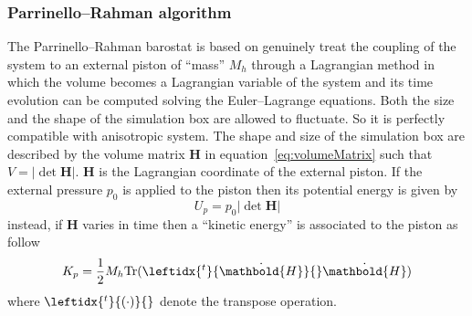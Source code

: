 \subsubsection{Parrinello--Rahman algorithm}
The Parrinello--Rahman barostat \cite{ParrinelloBarostat1}\cite{ParrinelloBarostat2} is based on genuinely treat 
the coupling of the system to an external piston of ``mass'' $M_h$ through a Lagrangian method in which the 
volume becomes a Lagrangian variable of the system and its time evolution can be computed solving the 
Euler--Lagrange equations. Both the size and the shape of the simulation box are allowed to fluctuate. So it is 
perfectly compatible with anisotropic system. The shape and size of the simulation box are described by the 
volume matrix $ \mathbold{H}$ in equation~\eqref{eq:volumeMatrix} such that $V = |\det\mathbold{H}|$. 
$\mathbold{H}$ is the Lagrangian coordinate of the external piston. If the external pressure $p_0$ is applied to 
the piston then its potential energy is given by
\begin{equation*}
	U_p = p_0 |\det  \mathbold{H}|
\end{equation*}
instead, if $ \mathbold{H}$ varies in time then a ``kinetic energy'' is associated to the piston as follow
\begin{equation*}
	K_p = \frac{1}{2}M_h \text{Tr}(\leftidx{^t}{\dot{ \mathbold{H}}}{} \dot{ \mathbold{H}} )
\end{equation*}
where $\leftidx{^t}{(\cdot)}{}$ denote the transpose operation.

